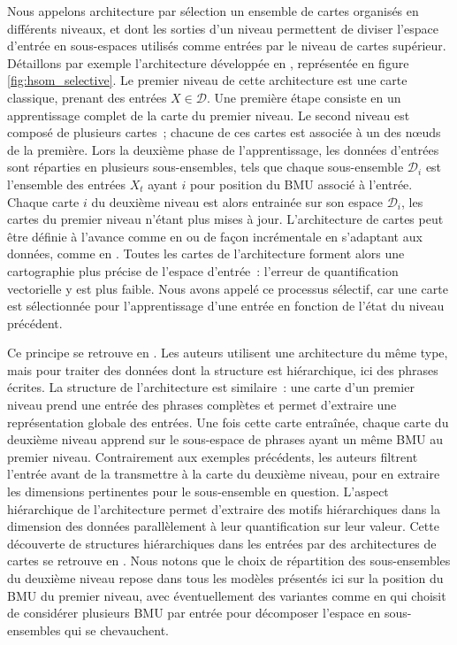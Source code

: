 \documentclass[../main]{subfiles}
\begin{document}
Nous appelons architecture par sélection un ensemble de cartes organisés en différents niveaux, et dont les sorties d'un niveau permettent de diviser l'espace d'entrée en sous-espaces utilisés comme entrées par le niveau de cartes supérieur. Détaillons par exemple l'architecture développée en \cite{barbalho_hierarchical_2001}, représentée en figure \ref{fig:hsom_selective}. 
Le premier niveau de cette architecture est une carte classique, prenant des entrées $X \in \mathcal{D}$.
Une première étape consiste en un apprentissage complet de la carte du premier niveau.
Le second niveau est composé de plusieurs cartes~; chacune de ces cartes est associée à un des n\oe{}uds de la première.
Lors la deuxième phase de l'apprentissage, les données d'entrées sont réparties en plusieurs sous-ensembles, tels que chaque sous-ensemble $\mathcal{D}_i$ est l'ensemble des entrées $X_t$ ayant $i$ pour position du BMU associé à l'entrée.
Chaque carte $i$ du deuxième niveau est alors entrainée sur son espace $\mathcal{D}_i$, les cartes du premier niveau n'étant plus mises à jour.
L'architecture de cartes peut être définie à l'avance comme en \cite{barbalho_hierarchical_2001} ou de façon incrémentale en s'adaptant aux données, comme en \cite{Costa2016ANS}.
Toutes les cartes de l'architecture forment alors une cartographie plus précise de l'espace d'entrée~: l'erreur de quantification vectorielle y est plus faible.
Nous avons appelé ce processus sélectif, car une carte est sélectionnée pour l'apprentissage d'une entrée en fonction de l'état du niveau précédent.

Ce principe se retrouve en \cite{miikkulainen_script_1992}. 
Les auteurs utilisent une architecture du même type, mais pour traiter des données dont la structure est hiérarchique, ici des phrases écrites. La structure de l'architecture est similaire~: une carte d'un premier niveau prend une entrée des phrases complètes et permet d'extraire une représentation globale des entrées. Une fois cette carte entraînée, chaque carte du deuxième niveau apprend sur le sous-espace de phrases ayant un même BMU au premier niveau. Contrairement aux exemples précédents, les auteurs filtrent l'entrée avant de la transmettre à la carte du deuxième niveau, pour en extraire les dimensions pertinentes pour le sous-ensemble en question. L'aspect hiérarchique de l'architecture permet d'extraire des motifs hiérarchiques dans la dimension des données parallèlement à leur quantification sur leur valeur.
Cette découverte de structures hiérarchiques dans les entrées par des architectures de cartes se retrouve en \cite{ordonez_hierarchical_2010,dittenbach_growing_2000}.
Nous notons que le choix de répartition des sous-ensembles du deuxième niveau repose dans tous les modèles présentés ici sur la position du BMU du premier niveau, avec éventuellement des variantes comme en \cite{suganthan_pattern_2001} qui choisit de considérer plusieurs BMU par entrée pour décomposer l'espace en sous-ensembles qui se chevauchent.
\end{document}
